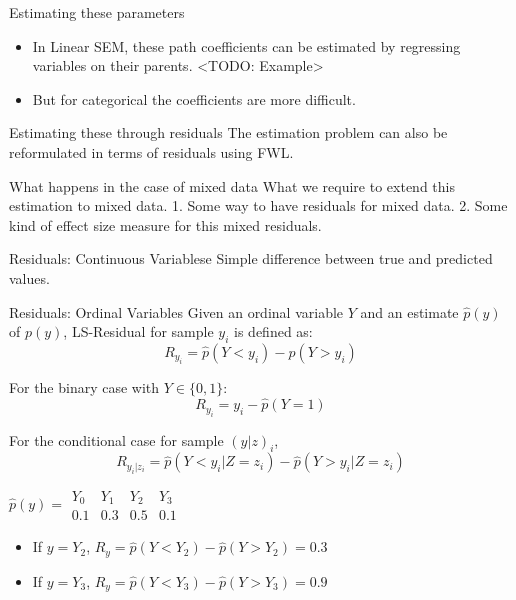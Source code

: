 \documentclass{beamer}
\begin{document}
\begin{frame}{Estimating these parameters}
	\begin{itemize}
		\item In Linear SEM, these path coefficients can be estimated by regressing
			variables on their parents. <TODO: Example>
		\item But for categorical the coefficients are more difficult.
	\end{itemize}
\end{frame}

\begin{frame}{Estimating these through residuals}
	The estimation problem can also be reformulated in terms of residuals using FWL.
\end{frame}

\begin{frame}{What happens in the case of mixed data}
	What we require to extend this estimation to mixed data.
	1. Some way to have residuals for mixed data.
	2. Some kind of effect size measure for this mixed residuals.
\end{frame}

\begin{frame}{Residuals: Continuous Variablese}
	Simple difference between true and predicted values.
\end{frame}

\begin{frame}{Residuals: Ordinal Variables}
	Given an ordinal variable $ Y $ and an estimate $ \hat{p}(y) $ of $
	p(y) $, LS-Residual for sample $ y_i $ is defined as:
	$$ R_{y_i} = \hat{p}(Y < y_i) - \hat{p}(Y > y_i) $$
	\vspace{1em}

	For the binary case with $ Y \in \{0, 1\} $:
	$$ R_{y_i} = y_i - \hat{p}(Y = 1) $$
	\vspace{1em}

	For the conditional case for sample $ (y|z)_i $,
	$$ R_{y_i | z_i} = \hat{p}(Y < y_i | Z=z_i) - \hat{p}(Y>y_i|Z=z_i) $$

	$ \hat{p}(y) = \begin{array}{llll} Y_0 & Y_1 & Y_2 & Y_3 \\ 0.1 & 0.3 & 0.5 & 0.1 \end{array} $
	\begin{itemize}
		\item If $ y = Y_2 $, $ R_{y} = \hat{p}(Y < Y_2) - \hat{p}(Y > Y_2) = 0.3 $
		\item If $ y = Y_3 $, $ R_{y} = \hat{p}(Y < Y_3) - \hat{p}(Y > Y_3) = 0.9 $
	\end{itemize}
\end{frame}
\end{document}
